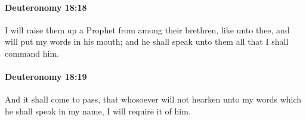 		\paragraph{Deuteronomy 18:18} %
			\label{DEUTERONOMY-18-18}

			I will raise them up a Prophet from among their brethren, like unto thee, and will put my words in his mouth; and he shall speak unto them all that I shall command him.


		\paragraph{Deuteronomy 18:19} %
			\label{DEUTERONOMY-18-19}

			And it shall come to pass, that whosoever will not hearken unto my words which he shall speak in my name, I will require it of him.


